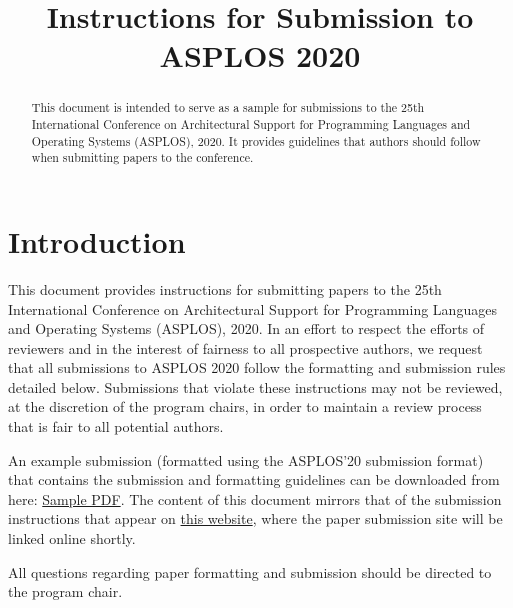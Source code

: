 \documentclass[pageno]{jpaper}
\begin{document}
\title{
Instructions for Submission to ASPLOS 2020}

\date{}
\maketitle

\thispagestyle{empty}

\begin{abstract}

This document is intended to serve as a sample for submissions to the
25th International Conference on Architectural Support for Programming
Languages and Operating Systems (ASPLOS), 2020.  It provides
guidelines that authors should follow when submitting papers to the
conference.

\end{abstract}

\section{Introduction}

This document provides instructions for submitting papers to the 25th
International Conference on Architectural Support for Programming
Languages and Operating Systems (ASPLOS), 2020.  In an effort to
respect the efforts of reviewers and in the interest of fairness to
all prospective authors, we request that all submissions to ASPLOS
2020 follow the formatting and submission rules detailed below.
Submissions that violate these instructions may not be reviewed, at the
discretion of the program chairs, in order to maintain a review process
that is fair to all potential authors.

An example submission (formatted using the ASPLOS'20 submission
format) that contains the submission and formatting guidelines can be
downloaded from here:
\href{https://asplos-conference.org/wp-content/uploads/2019/07/asplos20-template.pdf}{Sample PDF}. The content of
this document mirrors that of the submission instructions that appear
on \href{https://asplos-conference.org/submissions/}{this
website}, where the paper submission site will be linked online
shortly.

All questions regarding paper formatting and submission should be directed
to the program chair.
\end{document}
